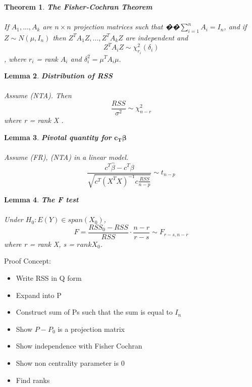 \documentclass{article}
\newtheorem{lemma}{Lemma}
\newtheorem{theorem}[lemma]{Theorem}
\begin{document}
\begin{theorem}
 \textbf{The Fisher-Cochran Theorem} \\
 \\
 If $A_1, ... , A_k$ are $n \times n$ projection matrices such that ��$ \sum^n_{i=1} A_i = I_n$, and if $Z \sim N(\mu,I_n)$ then $Z^TA_1Z,...,Z^TA_kZ$ are independent and
$$Z^TA_iZ \sim \chi^2_{r_i} (\delta_i)$$, where $r_i$ = rank $A_i$ and $\delta_i^2 = \mu ^T A_i \mu$.
\end{theorem}
\begin{lemma}
\textbf{Distribution of RSS} \\
\\Assume (NTA). Then
$$\frac{RSS}{\sigma^2} \sim \chi^2_{n - r}$$
where r = rank X .
\end{lemma}


\begin{lemma} \textbf{Pivotal quantity for} $\mathbf{c_T} \boldsymbol{\beta}$ \\
\\
Assume (FR), (NTA) in a linear model. 
$$
\frac{c^T \hat{\beta} - c^T \beta}{\sqrt{c^T(X^TX)^{-1}c \frac{RSS}{n-p}}} \sim t_{n-p}$$
\end{lemma}

\begin{lemma} \textbf{The F test} \\
\\
Under $H_0 : E(Y) \in span(X_0)$,
$$ F = \frac{RSS_0 - RSS}{RSS} \cdot \frac{n - r}{ r - s} \sim F_{r - s,n - r}
$$
where r = rank X, s = $rank X_0$.
\end{lemma}
Proof Concept:
\begin{itemize}
    \item Write RSS in Q form
    \item Expand into P
    \item Construct sum of Ps such that the sum is equal to $I_n$
    \item Show $P-P_0$ is a projection matrix
    \item Show independence with Fisher Cochran
    \item Show non centrality parameter is 0
    \item Find ranks
\end{itemize}
\end{document}
